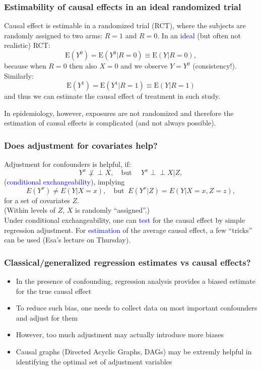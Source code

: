 \documentclass[10pt,dvipsnames,t,handout%
,aspectratio=169%
]{beamer}%
\newcommand{\E}{\mathrm{E}}
\newcommand{\indep}{\perp\!\!\!\!\perp}
\newcommand{\sini}[1]{\textcolor{Blue}{#1}}
\newcommand{\puna}[1]{\textcolor{BrickRed}{#1}}
\begin{document}
\begin{frame}
	\frametitle{Estimability of causal effects in an ideal randomized trial}
	Causal effect is estimable in a \puna{randomized trial (RCT)}, where the subjects are randomly assigned to two arms: $R=1$ and $R=0$. In an \sini{ideal} (but often not realistic) RCT: 
		$$\E(Y^0) = \E(Y^0|R=0) \equiv \E(Y|R=0),$$
	because when $R=0$ then also $X=0$ and we observe $Y=Y^0$ (consistency!). \\  
	Similarly: 
	$$\E(Y^1) = \E(Y^1|R=1) \equiv \E(Y|R=1)$$ 
	and thus we can estimate the causal effect of treatment in such study.
	\begin{block}{}	
		In epidemiology, however, exposures are not randomized and therefore the estimation of causal effects is complicated (and not always possible).
	\end{block}
\end{frame}


\begin{frame}
	\frametitle{Does adjustment for covariates help?}
	Adjustment for confounders is helpful, if:
	$$Y^x \not\indep X, \quad  \text{but } \quad Y^x \indep X | Z,$$ (\sini{conditional exchangeability}), implying 
	$$E(Y^x) \ne E(Y|X=x), \quad \text{but } \
	E(Y^x|Z) = E(Y|X=x, Z=z),$$
	for a set of covariates $Z$. \\
	(Within levels of $Z$, $X$ is randomly ``assigned''.)\\[5mm]
	Under conditional exchangeability, one can \sini{test} for the causal effect by simple regression adjustment. For \sini{estimation} of the average causal effect, a few ``tricks'' can be used (Esa's lecture on Thursday). 
\end{frame}




\begin{frame}
 \frametitle{Classical/generalized regression estimates vs  causal effects?}
 \begin{itemize}
 \item In the presence of confounding, regression analysis provides a biased estimate for the true causal effect
\item To reduce such bias, one needs to collect data on most important confounders and adjust for them
\item However, too much adjustment may actually introduce more biases   
\item Causal graphs (Directed Acyclic Graphs, DAGs) may be extremly helpful in identifying the optimal set of adjustment variables
\end{itemize}
 \end{frame}
\end{document}
